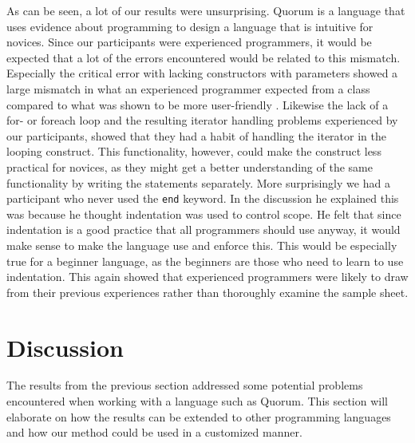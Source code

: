 \documentclass[preprint,10pt]{sigplanconf}
\begin{document}
As can be seen, a lot of our results were unsurprising.
Quorum is a language that uses evidence about programming to design a language that is intuitive for novices.
Since our participants were experienced programmers, it would be expected that a lot of the errors encountered would be related to this mismatch.
Especially the critical error with lacking constructors with parameters showed a large mismatch in what an experienced programmer expected from a class compared to what was shown to be more user-friendly \cite{ParamConstructors}.
Likewise the lack of a for- or foreach loop and the resulting iterator handling problems experienced by our participants, showed that they had a habit of handling the iterator in the looping construct.
This functionality, however, could make the construct less practical for novices, as they might get a better understanding of the same functionality by writing the statements separately.
More surprisingly we had a participant who never used the \lstinline!end! keyword.
In the discussion he explained this was because he thought indentation was used to control scope.
He felt that since indentation is a good practice that all programmers should use anyway, it would make sense to make the language use and enforce this.
This would be especially true for a beginner language, as the beginners are those who need to learn to use indentation.
This again showed that experienced programmers were likely to draw from their previous experiences rather than thoroughly examine the sample sheet.

\section{Discussion}
The results from the previous section addressed some potential problems encountered when working with a language such as Quorum. This section will elaborate on how the results can be extended to other programming languages and how our method could be used in a customized manner.
\end{document}
